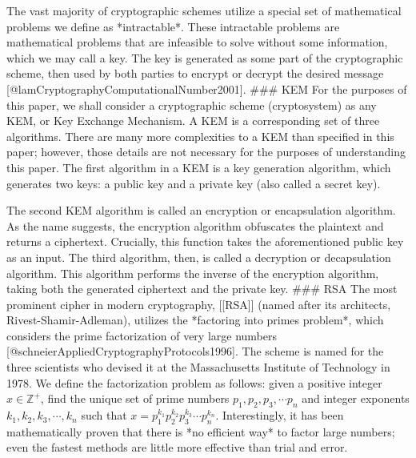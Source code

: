 \documentclass[12pt]{article}
\begin{document}
The vast majority of cryptographic schemes utilize a special set of mathematical problems we define as *intractable*. These intractable problems are mathematical problems that are infeasible to solve without some information, which we may call a key. The key is generated as some part of the cryptographic scheme, then used by both parties to encrypt or decrypt the desired message [@lamCryptographyComputationalNumber2001]. 
### KEM
For the purposes of this paper, we shall consider a cryptographic scheme (cryptosystem) as any KEM, or Key Exchange Mechanism. A KEM is a corresponding set of three algorithms. There are many more complexities to a KEM than specified in this paper; however, those details are not necessary for the purposes of understanding this paper. The first algorithm in a KEM is a key generation algorithm, which generates two keys: a public key and a private key (also called a secret key). 

The second KEM algorithm is called an encryption or encapsulation algorithm. As the name suggests, the encryption algorithm obfuscates the plaintext and returns a ciphertext. Crucially, this function takes the aforementioned public key as an input. The third algorithm, then, is called a decryption or decapsulation algorithm. This algorithm performs the inverse of the encryption algorithm, taking both the generated ciphertext and the private key. 
### RSA
The most prominent cipher in modern cryptography, [[RSA]] (named after its architects, Rivest-Shamir-Adleman), utilizes the *factoring into primes problem*, which considers the prime factorization of very large numbers [@schneierAppliedCryptographyProtocols1996]. The scheme is named for the three scientists who devised it at the Massachusetts Institute of Technology in 1978. We define the factorization problem as follows: given a positive integer $x \in \mathbb{Z}^+$, find the unique set of prime numbers $p_1, p_2, p_3, \cdots p_n$ and integer exponents $k_1, k_2, k_3,\cdots,k_n$ such that $x = p_1^{k_1}p_2^{k_2}p_3^{k_3} \cdots p_n^{k_n}$. Interestingly, it has been mathematically proven that there is *no efficient way* to factor large numbers; even the fastest methods are little more effective than trial and error. 
\end{document}
